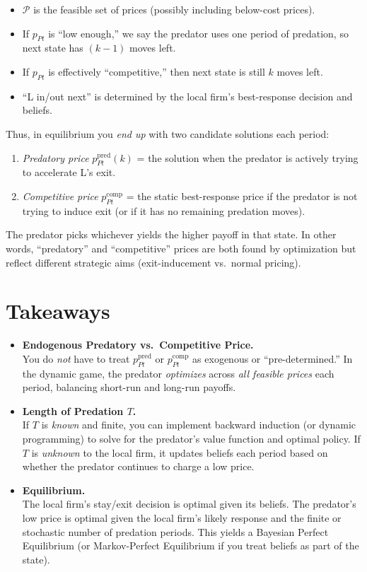\documentclass[12pt,oneside]{article}
\theoremstyle{definition}
\theoremstyle{remark}
\begin{document}
\begin{itemize}
\item $\mathcal{P}$ is the feasible set of prices (possibly including below-cost prices).
\item If $p_{Pt}$ is ``low enough,'' we say the predator uses one period of predation, so next state has $(k-1)$ moves left.
\item If $p_{Pt}$ is effectively ``competitive,'' then next state is still $k$ moves left.
\item ``L in/out next'' is determined by the local firm's best-response decision and beliefs.
\end{itemize}

\noindent
Thus, in equilibrium you \emph{end up} with two candidate solutions each period:
\begin{enumerate}
\item \emph{Predatory price} $p_{Pt}^{\text{pred}}(k)$ = the solution when the predator is actively trying to accelerate L's exit.
\item \emph{Competitive price} $p_{Pt}^{\text{comp}}$ = the static best-response price if the predator is not trying to induce exit (or if it has no remaining predation moves).
\end{enumerate}

\noindent
The predator picks whichever yields the higher payoff in that state. In other words, ``predatory'' and ``competitive'' prices are both found by optimization but reflect different strategic aims (exit-inducement vs.\ normal pricing).

\section{Takeaways}

\begin{itemize}
\item \textbf{Endogenous Predatory vs.\ Competitive Price.}\\
You do \emph{not} have to treat $p_{Pt}^{\text{pred}}$ or $p_{Pt}^{\text{comp}}$ as exogenous or ``pre-determined.'' In the dynamic game, the predator \emph{optimizes} across \emph{all feasible prices} each period, balancing short-run and long-run payoffs.

\item \textbf{Length of Predation $T$.}\\
If $T$ is \emph{known} and finite, you can implement backward induction (or dynamic programming) to solve for the predator's value function and optimal policy. If $T$ is \emph{unknown} to the local firm, it updates beliefs each period based on whether the predator continues to charge a low price.

\item \textbf{Equilibrium.}\\
The local firm's stay/exit decision is optimal given its beliefs. The predator's low price is optimal given the local firm's likely response and the finite or stochastic number of predation periods. This yields a Bayesian Perfect Equilibrium (or Markov-Perfect Equilibrium if you treat beliefs as part of the state).
\end{itemize}
\end{document}
